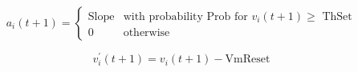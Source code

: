\begin{equation}
  a_i(t+1)=\left\{
    \begin{array}{ll}
      \mbox{Slope} & \mbox{with probability Prob for $v_i(t+1) \geq$ ThSet}\\
      0 & \mbox{otherwise}
    \end{array} \right.
\end{equation}

\begin{equation}
  v_i^{'}(t+1) = v_i(t+1) - \mbox{VmReset}
\end{equation}
